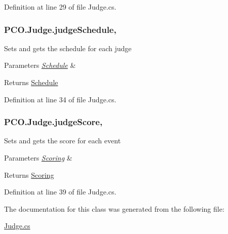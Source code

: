 Definition at line 29 of file Judge.\+cs.

\hypertarget{classPCO_1_1Judge_abc1631a408c0d72e62daa23783cc6330}{
\subsubsection[{judge\+Schedule}]{ P\+C\+O.\+Judge.\+judge\+Schedule\hspace{0.3cm}{\ttfamily [get]}, {\ttfamily [set]}}}\label{classPCO_1_1Judge_abc1631a408c0d72e62daa23783cc6330}
Sets and gets the schedule for each judge 
\begin{DoxyParams}{Parameters}
{\em \hyperlink{classPCO_1_1Schedule}{Schedule}} & \\
\hline
\end{DoxyParams}
\begin{DoxyReturn}{Returns}
\hyperlink{classPCO_1_1Schedule}{Schedule} 
\end{DoxyReturn}


Definition at line 34 of file Judge.\+cs.

\hypertarget{classPCO_1_1Judge_a76d950e6f90615fe320c12db369da4c4}{
\subsubsection[{judge\+Score}]{ P\+C\+O.\+Judge.\+judge\+Score\hspace{0.3cm}{\ttfamily [get]}, {\ttfamily [set]}}}\label{classPCO_1_1Judge_a76d950e6f90615fe320c12db369da4c4}
Sets and gets the score for each event 
\begin{DoxyParams}{Parameters}
{\em \hyperlink{classPCO_1_1Scoring}{Scoring}} & \\
\hline
\end{DoxyParams}
\begin{DoxyReturn}{Returns}
\hyperlink{classPCO_1_1Scoring}{Scoring} 
\end{DoxyReturn}


Definition at line 39 of file Judge.\+cs.



The documentation for this class was generated from the following file\+:\begin{DoxyCompactItemize}
\item 
\hyperlink{Judge_8cs}{Judge.\+cs}\end{DoxyCompactItemize}
